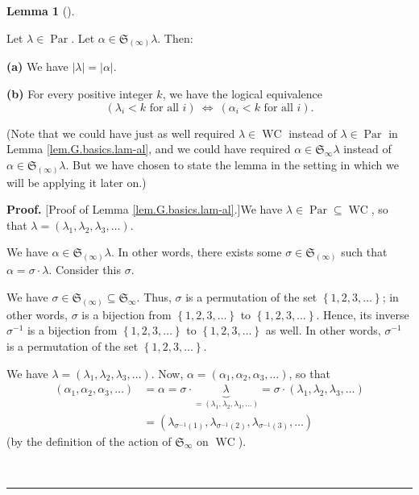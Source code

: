 \documentclass[numbers=enddot,12pt,final,onecolumn,notitlepage]{scrartcl}%
\theoremstyle{definition}
\newtheorem{lem}[theo]{Lemma}
\newenvironment{lemma}[1][]
{\begin{lem}[#1]\begin{leftbar}}
{\end{leftbar}\end{lem}}
\newenvironment{proof}[1][Proof]{\noindent\textbf{#1.} }{\ \rule{0.5em}{0.5em}}
\newenvironment{verlong}{}{}
\begin{document}
\begin{verlong}
\begin{lemma}
\label{lem.G.basics.lam-al}Let $\lambda\in\operatorname*{Par}$. Let $\alpha
\in\mathfrak{S}_{\left(  \infty\right)  }\lambda$. Then:

\textbf{(a)} We have $\left\vert \lambda\right\vert =\left\vert \alpha
\right\vert $.

\textbf{(b)} For every positive integer $k$, we have the logical
equivalence\footnotemark%
\[
\left(  \lambda_{i}<k\text{ for all }i\right)  \ \Longleftrightarrow\ \left(
\alpha_{i}<k\text{ for all }i\right)  .
\]

\end{lemma}

 (Note that we could have just as well required
$\lambda\in\operatorname*{WC}$ instead of $\lambda\in\operatorname*{Par}$ in
Lemma \ref{lem.G.basics.lam-al}, and we could have required $\alpha
\in\mathfrak{S}_{\infty}\lambda$ instead of $\alpha\in\mathfrak{S}_{\left(
\infty\right)  }\lambda$. But we have chosen to state the lemma in the setting
in which we will be applying it later on.)

\begin{proof}
[Proof of Lemma \ref{lem.G.basics.lam-al}.]We have $\lambda\in
\operatorname*{Par}\subseteq\operatorname*{WC}$, so that $\lambda=\left(
\lambda_{1},\lambda_{2},\lambda_{3},\ldots\right)  $.

We have $\alpha\in\mathfrak{S}_{\left(  \infty\right)  }\lambda$. In other
words, there exists some $\sigma\in\mathfrak{S}_{\left(  \infty\right)  }$
such that $\alpha=\sigma\cdot\lambda$. Consider this $\sigma$.

We have $\sigma\in\mathfrak{S}_{\left(  \infty\right)  }\subseteq
\mathfrak{S}_{\infty}$. Thus, $\sigma$ is a permutation of the set $\left\{
1,2,3,\ldots\right\}  $; in other words, $\sigma$ is a bijection from
$\left\{  1,2,3,\ldots\right\}  $ to $\left\{  1,2,3,\ldots\right\}  $. Hence,
its inverse $\sigma^{-1}$ is a bijection from $\left\{  1,2,3,\ldots\right\}
$ to $\left\{  1,2,3,\ldots\right\}  $ as well. In other words, $\sigma^{-1}$
is a permutation of the set $\left\{  1,2,3,\ldots\right\}  $.

We have $\lambda=\left(  \lambda_{1},\lambda_{2},\lambda_{3},\ldots\right)  $.
Now, $\alpha=\left(  \alpha_{1},\alpha_{2},\alpha_{3},\ldots\right)  $, so
that%
\begin{align*}
\left(  \alpha_{1},\alpha_{2},\alpha_{3},\ldots\right)   &  =\alpha
=\sigma\cdot\underbrace{\lambda}_{=\left(  \lambda_{1},\lambda_{2},\lambda
_{3},\ldots\right)  }=\sigma\cdot\left(  \lambda_{1},\lambda_{2},\lambda
_{3},\ldots\right) \\
&  =\left(  \lambda_{\sigma^{-1}\left(  1\right)  },\lambda_{\sigma
^{-1}\left(  2\right)  },\lambda_{\sigma^{-1}\left(  3\right)  }%
,\ldots\right)
\end{align*}
(by the definition of the action of $\mathfrak{S}_{\infty}$ on
$\operatorname*{WC}$).


\end{proof}
\end{verlong}
\end{document}
